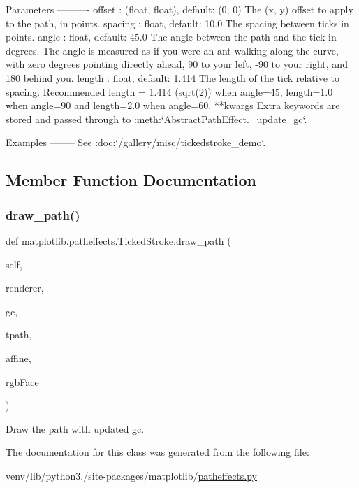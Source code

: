 \begin{DoxyVerb}Parameters
----------
offset : (float, float), default: (0, 0)
    The (x, y) offset to apply to the path, in points.
spacing : float, default: 10.0
    The spacing between ticks in points.
angle : float, default: 45.0
    The angle between the path and the tick in degrees.  The angle
    is measured as if you were an ant walking along the curve, with
    zero degrees pointing directly ahead, 90 to your left, -90
    to your right, and 180 behind you.
length : float, default: 1.414
    The length of the tick relative to spacing.
    Recommended length = 1.414 (sqrt(2)) when angle=45, length=1.0
    when angle=90 and length=2.0 when angle=60.
**kwargs
    Extra keywords are stored and passed through to
    :meth:`AbstractPathEffect._update_gc`.

Examples
--------
See :doc:`/gallery/misc/tickedstroke_demo`.
\end{DoxyVerb}
 

\subsection{Member Function Documentation}
\mbox{\label{classmatplotlib_1_1patheffects_1_1TickedStroke_ad2aedb41ade5de1d45ab82b6e2e445f2}} 
\subsubsection{\texorpdfstring{draw\+\_\+path()}{draw\_path()}}
{\footnotesize\ttfamily def matplotlib.\+patheffects.\+Ticked\+Stroke.\+draw\+\_\+path (\begin{DoxyParamCaption}\item[{}]{self,  }\item[{}]{renderer,  }\item[{}]{gc,  }\item[{}]{tpath,  }\item[{}]{affine,  }\item[{}]{rgb\+Face }\end{DoxyParamCaption})}

\begin{DoxyVerb}Draw the path with updated gc.\end{DoxyVerb}
 

The documentation for this class was generated from the following file\+:\begin{DoxyCompactItemize}
\item 
venv/lib/python3./site-\/packages/matplotlib/\hyperlink{patheffects_8py}{patheffects.\+py}\end{DoxyCompactItemize}
